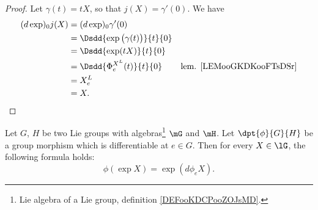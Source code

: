 \begin{proof}
	Let \( \gamma(t)=tX\), so that \( j(X)=\gamma'(0)\). We have
	\begin{subequations}
		\begin{align}
			(d\exp)_0j(X) & =(d\exp)_0\gamma'(0)                                                            \\
			              & =\Dsdd{ \exp\big( \gamma(t) \big) }{t}{0}                                       \\
			              & =\Dsdd{ \exp(tX) }{t}{0}                                                        \\
			              & =\Dsdd{ \Phi_e^{X^L}(t) }{t}{0}           & \text{lem. \ref{LEMooGKDKooFTsDSr}} \\
			              & =X^L_e                                                                          \\
			              & =X.
		\end{align}
	\end{subequations}
\end{proof}


\begin{proposition}       \label{PROPooKYNDooVAEzFw}
	Let $G$, $H$ be two Lie groups with algebras\footnote{Lie algebra of a Lie group, definition \ref{DEFooKDCPooZOJsMD}.} $\mG$ and $\mH$. Let $\dpt{\phi}{G}{H}$ be a group morphism which is differentiable at $e\in G$. Then for every $X\in\lG$, the following formula holds:
	\begin{equation}
		\phi(\exp X)=\exp(d\phi_eX).
	\end{equation}
\end{proposition}

